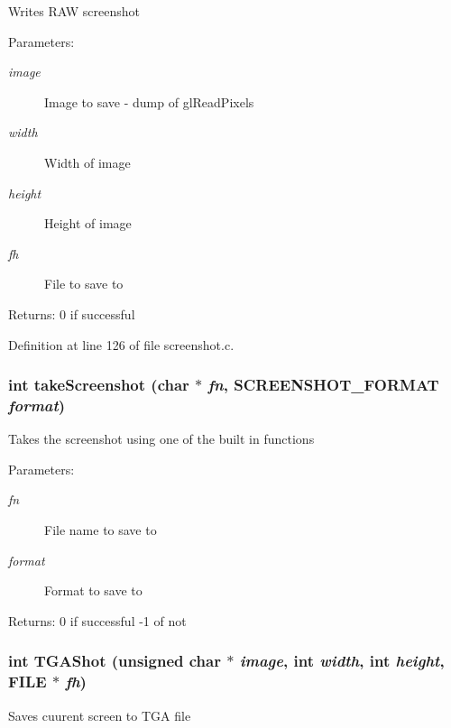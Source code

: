 Writes RAW screenshot \begin{Desc}
\item[Parameters:]
\begin{description}
\item[{\em image}]Image to save - dump of gl\-Read\-Pixels \item[{\em width}]Width of image \item[{\em height}]Height of image \item[{\em fh}]File to save to \end{description}
\end{Desc}
\begin{Desc}
\item[Returns:]0 if successful \end{Desc}


Definition at line 126 of file screenshot.c.
\subsubsection{\setlength{\rightskip}{0pt plus 5cm}int take\-Screenshot (char $\ast$ {\em fn}, {\bf SCREENSHOT\_\-FORMAT} {\em format})}\label{screenshot_8h_a4}


Takes the screenshot using one of the built in functions

\begin{Desc}
\item[Parameters:]
\begin{description}
\item[{\em fn}]File name to save to \item[{\em format}]Format to save to \end{description}
\end{Desc}
\begin{Desc}
\item[Returns:]0 if successful -1 of not \end{Desc}
\subsubsection{\setlength{\rightskip}{0pt plus 5cm}int TGAShot (unsigned char $\ast$ {\em image}, int {\em width}, int {\em height}, FILE $\ast$ {\em fh})}\label{screenshot_8h_a6}


Saves cuurent screen to TGA file

